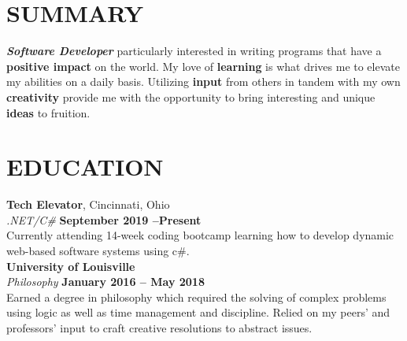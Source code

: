 \documentclass[margin,line]{resume}
\begin{document}
\begin{resume}

    \vspace{-3mm}

    \section{\mysidestyle \textbf{\large{S}\small{UMMARY}}}

    \textbf{\textsl{Software Developer}} particularly interested in writing programs that have a \textbf{positive impact} on the world. My love of \textbf{learning} is what drives me to elevate my abilities on a daily basis. Utilizing \textbf{input} from others in tandem with my own \textbf{creativity} provide me with the opportunity to bring interesting and unique \textbf{ideas} to fruition.

    \vspace{-1mm}

\sectionline

    \section{\mysidestyle \textbf{\large{E}\small{DUCATION}}}

    \textbf{\listing Tech Elevator}, Cincinnati, Ohio \vspace{1mm}\\
    \textsl{.NET/C\#} \hfill \textbf{September 2019 --Present}\vspace{1mm}\\\vspace{0mm}%
     Currently attending 14-week coding bootcamp learning how to develop dynamic web-based software systems using c\#. \vspace{-5mm}\\

    \textbf{\listing University of Louisville} \vspace{1mm}\\
    \textsl{Philosophy} \hfill \textbf{January 2016 -- May 2018}\vspace{1mm}\\\vspace{0mm}%
     Earned a degree in philosophy which required the solving of complex problems using logic as well as time management and discipline. Relied on my peers' and professors' input to craft creative resolutions to abstract issues. 


\end{resume}
\end{document}
